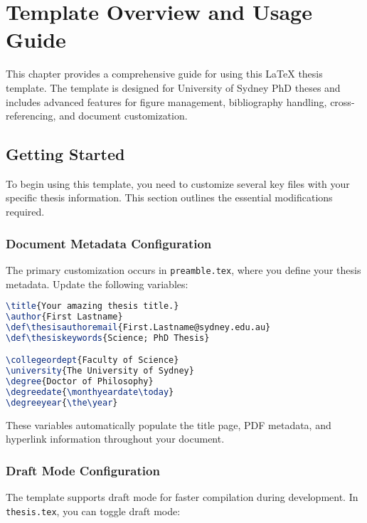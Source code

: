\chapter{Template Overview and Usage Guide}
\label{chap:overview}
\newrefsegment
\glsresetall

This chapter provides a comprehensive guide for using this LaTeX thesis template. The template is designed for University of Sydney PhD theses and includes advanced features for figure management, bibliography handling, cross-referencing, and document customization.

\section{Getting Started}
\label{sect:getting-started}

To begin using this template, you need to customize several key files with your specific thesis information. This section outlines the essential modifications required.

\subsection{Document Metadata Configuration}
\label{sect:metadata-config}

The primary customization occurs in \texttt{preamble.tex}, where you define your thesis metadata. Update the following variables:

\begin{lstlisting}[language=TeX,caption={Document metadata in preamble.tex}]
% Document setup using dynamic variables
\title{Your amazing thesis title.}
\author{First Lastname}
\def\thesisauthoremail{First.Lastname@sydney.edu.au}
\def\thesiskeywords{Science; PhD Thesis}

\collegeordept{Faculty of Science}
\university{The University of Sydney}
\degree{Doctor of Philosophy}
\degreedate{\monthyeardate\today}
\degreeyear{\the\year}
\end{lstlisting}

These variables automatically populate the title page, PDF metadata, and hyperlink information throughout your document.

\subsection{Draft Mode Configuration}
\label{sect:draft-mode}

The template supports draft mode for faster compilation during development. In \texttt{thesis.tex}, you can toggle draft mode:

